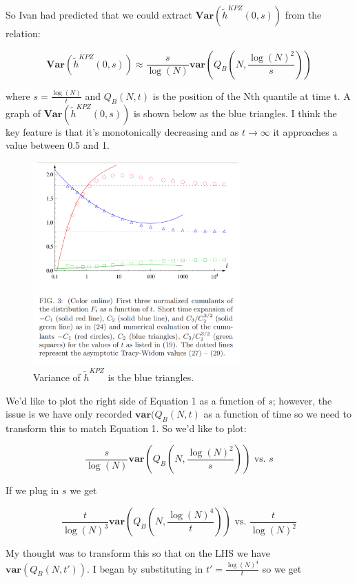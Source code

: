 \documentclass{article}
\begin{document}
So Ivan had predicted that we could extract $\textbf{Var}(\tilde{h}^{KPZ}(0, s))$ from the relation:

\begin{equation}
\textbf{Var}(\tilde{h}^{KPZ}(0, s)) \approx \frac{s}{\log(N)}\textbf{var}(Q_{B}(N, \frac{\log(N)^{2}}{s}))
\end{equation}

where $s=\frac{\log(N)}{t}$ and $Q_{B}(N, t)$ is the position of the Nth quantile at time t. A graph of $\textbf{Var}(\tilde{h}^{KPZ}(0, s))$ is shown below as the blue triangles. I think the key feature is that it's monotonically decreasing and as $t \rightarrow \infty$ it approaches a value between 0.5 and 1.

\begin{figure}[h]
\centering
\includegraphics[width=8cm]{KPZGraph}
\caption{Variance of $\tilde{h}^{KPZ}$ is the blue triangles.}
\end{figure}

We'd like to plot the right side of Equation 1 as a function of $s$; however, the issue is we have only recorded $\textbf{var}(Q_{B}(N, t)$ as a function of time so we need to transform this to match Equation 1. So we'd like to plot:

\begin{equation}
\frac{s}{\log(N)}\textbf{var}(Q_{B}(N, \frac{\log(N)^{2}}{s}))  \textrm{ vs. }  s
\end{equation}

If we plug in $s$ we get

\begin{equation}
\frac{t}{\log(N)^{3}}\textbf{var}(Q_{B}(N, \frac{\log(N)^{4}}{t}))  \textrm{ vs. }  \frac{t}{\log(N)^{2}}
\end{equation}

My thought was to transform this so that on the LHS we have $\textbf{var}(Q_{B}(N, t'))$. I began by substituting in $t' = \frac{\log(N)^{4}}{t}$ so we get
\end{document}
